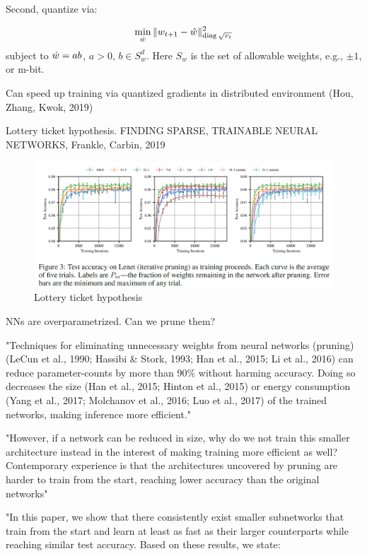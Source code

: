 \documentclass[english]{article}
\begin{document}
Second, quantize via: 

$$\min_{\hat{w}}\| w_{t+1} - \hat{w} \|^2_{\operatorname{diag}{\sqrt{v_t}}}$$ subject to $\hat{w} = ab$, $a>0$, $b\in S_w^d$. Here $S_w$ is the set of allowable weights, e.g., $\pm 1$, or m-bit.


Can speed up training via quantized gradients in distributed environment (Hou, Zhang, Kwok, 2019)

\item Lottery ticket hypothesis. FINDING SPARSE, TRAINABLE NEURAL NETWORKS, Frankle, Carbin, 2019

\begin{figure}
  \centering
  \includegraphics[width=\textwidth]{lot.png}
  \caption{Lottery ticket hypothesis}
  \label{lot}
\end{figure}

NNs are overparametrized. Can we prune them?

"Techniques for eliminating unnecessary weights from neural networks (pruning) (LeCun et al., 1990;
Hassibi \& Stork, 1993; Han et al., 2015; Li et al., 2016) can reduce parameter-counts by more than
90\% without harming accuracy. Doing so decreases the size (Han et al., 2015; Hinton et al., 2015)
or energy consumption (Yang et al., 2017; Molchanov et al., 2016; Luo et al., 2017) of the trained
networks, making inference more efficient." 

"However, if a network can be reduced in size, why do we
not train this smaller architecture instead in the interest of making training more efficient as well?
Contemporary experience is that the architectures uncovered by pruning are harder to train from the
start, reaching lower accuracy than the original networks"

"In this paper, we show that there consistently exist smaller subnetworks that train from the start and
learn at least as fast as their larger counterparts while reaching similar test accuracy. Based on these results, we state: 
\end{document}
